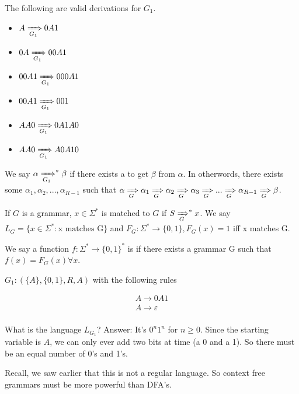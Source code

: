 The following are valid derivations for $G_1$.
\begin{itemize}
    \item $A \xRightarrow[G_1]{} 0A1$
    \item $0A \xRightarrow[G_1]{} 00A1$
    \item $00A1\xRightarrow[G_1]{} 000A1$
    \item $00A1 \xRightarrow[G_1]{} 001$
    \item $AA0 \xRightarrow[G_1]{} 0A1A0$
    \item $AA0 \xRightarrow[G_1]{} A0A10$
\end{itemize}

We say $\alpha \xRightarrow[G_1]{}^* \beta$ if there exists a  to get $\beta$ from $\alpha$. In otherwords, there exists some $\alpha_1, \alpha_2, ..., \alpha_{R - 1}$ such that $\alpha \xRightarrow[G]{} \alpha_1 \xRightarrow[G]{} \alpha_2 \xRightarrow[G]{} \alpha_3 \xRightarrow[G]{} ... \xRightarrow[G]{} \alpha_{R-1} \xRightarrow[G]{} \beta$.

\begin{definition}
    
    If $G$ is a grammar, $x \in \Sigma^*$ is matched to $G$ if $S \xRightarrow[G]{}^* x$.
    We say $L_G = \{ x \in \Sigma^*: \text{x matches G}\}$ and $F_G: \Sigma^* \rightarrow \{0, 1\}, F_G(x) = 1$ iff x matches G.

    We say a function $f: \Sigma^* \rightarrow \{0, 1\}^*$ is  if there exists a grammar G such that $f(x) = F_G(x) \forall x$.
\end{definition}

\begin{example}
    
    $G_1: (\{A\}, \{0, 1\}, R, A)$ with the following rules

    \begin{gather*}
        A \rightarrow 0A1 \\
        A \rightarrow \varepsilon \\
    \end{gather*}

    What is the language $L_{G_1}$? Answer: It's $0^n1^n$ for $n \ge 0$. Since the starting variable is $A$, we can only ever add two bits at time (a 0 and a 1). So there must be an equal number of 0's and 1's. 

    Recall, we saw earlier that this is not a regular language. So context free grammars must be more powerful than DFA's. 
\end{example}

